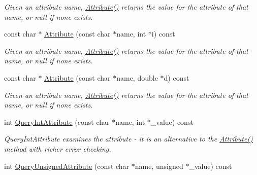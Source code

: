 \begin{DoxyCompactItemize}
\begin{DoxyCompactList}\small\item\em Given an attribute name, \hyperlink{class_ti_xml_element_ac1e4691e9375ba4e665dce7e46a50a9c}{Attribute()} returns the value for the attribute of that name, or null if none exists. \end{DoxyCompactList}\item 
const char $\ast$ \hyperlink{class_ti_xml_element_aa9192e80567b5042dbded80b78c44339}{Attribute} (const char $\ast$name, int $\ast$i) const 
\begin{DoxyCompactList}\small\item\em Given an attribute name, \hyperlink{class_ti_xml_element_ac1e4691e9375ba4e665dce7e46a50a9c}{Attribute()} returns the value for the attribute of that name, or null if none exists. \end{DoxyCompactList}\item 
const char $\ast$ \hyperlink{class_ti_xml_element_aec4f727f8aa49b51248d80125d173136}{Attribute} (const char $\ast$name, double $\ast$d) const 
\begin{DoxyCompactList}\small\item\em Given an attribute name, \hyperlink{class_ti_xml_element_ac1e4691e9375ba4e665dce7e46a50a9c}{Attribute()} returns the value for the attribute of that name, or null if none exists. \end{DoxyCompactList}\item 
int \hyperlink{class_ti_xml_element_aea0bfe471380f281c5945770ddbf52b9}{Query\+Int\+Attribute} (const char $\ast$name, int $\ast$\+\_\+value) const 
\begin{DoxyCompactList}\small\item\em Query\+Int\+Attribute examines the attribute -\/ it is an alternative to the \hyperlink{class_ti_xml_element_ac1e4691e9375ba4e665dce7e46a50a9c}{Attribute()} method with richer error checking. \end{DoxyCompactList}\item 
int \hyperlink{class_ti_xml_element_ae48df644f890ab86fa19839ac401f00d}{Query\+Unsigned\+Attribute} (const char $\ast$name, unsigned $\ast$\+\_\+value) const \hypertarget{class_ti_xml_element_ae48df644f890ab86fa19839ac401f00d}{}\label{class_ti_xml_element_ae48df644f890ab86fa19839ac401f00d}


\end{DoxyCompactItemize}
